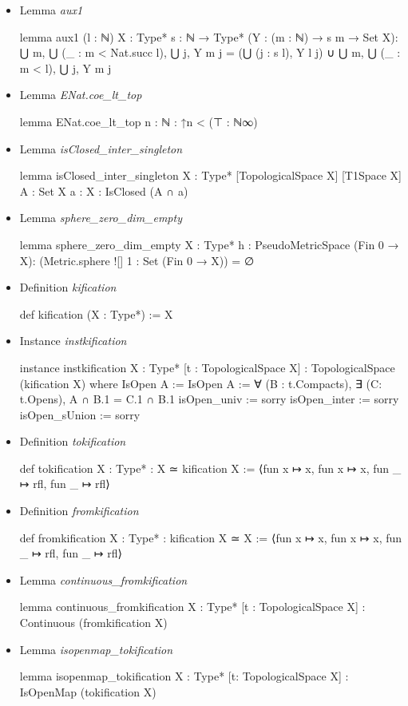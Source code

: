\documentclass[colorinlistoftodos]{article}
\begin{document}
\begin{itemize}
  \item Lemma \emph{aux1}
\begin{leancode}
lemma aux1 (l : ℕ) {X : Type*} {s : ℕ →  Type*} (Y : (m : ℕ) → s m → Set X):
    ⋃ m, ⋃ (_ : m < Nat.succ l), ⋃ j, Y m j = 
    (⋃ (j : s l), Y l j) ∪ ⋃ m, ⋃ (_ : m < l), ⋃ j, Y m j
\end{leancode}
  \item Lemma \emph{ENat.coe\_lt\_top}
\begin{leancode}
lemma ENat.coe_lt_top {n : ℕ} : ↑n < (⊤ : ℕ∞)
\end{leancode}
  \item Lemma \emph{isClosed\_inter\_singleton}
\begin{leancode}
lemma isClosed_inter_singleton {X : Type*} [TopologicalSpace X] [T1Space X] {A : Set X} 
{a : X} : IsClosed (A ∩ {a})
\end{leancode}
  \item Lemma \emph{sphere\_zero\_dim\_empty}
\begin{leancode}
lemma sphere_zero_dim_empty {X : Type*} {h : PseudoMetricSpace (Fin 0 → X)}:
  (Metric.sphere ![] 1 : Set (Fin 0 → X)) = ∅
\end{leancode}
  \item Definition \emph{kification}
\begin{leancode}
def kification (X : Type*) := X
\end{leancode}
  \item Instance \emph{instkification}
\begin{leancode}
instance instkification {X : Type*} [t : TopologicalSpace X] : 
TopologicalSpace (kification X) where
  IsOpen A := IsOpen A := ∀ (B : t.Compacts), ∃ (C: t.Opens), A ∩ B.1 = C.1 ∩ B.1
  isOpen_univ := sorry
  isOpen_inter := sorry
  isOpen_sUnion := sorry
\end{leancode}
  \item Definition \emph{tokification}
\begin{leancode}
def tokification {X : Type*} : X ≃ kification X := 
⟨fun x ↦ x, fun x ↦ x, fun _ ↦ rfl, fun _ ↦ rfl⟩
\end{leancode}
  \item Definition \emph{fromkification}
\begin{leancode}
def fromkification {X : Type*} : kification X ≃ X := 
⟨fun x ↦ x, fun x ↦ x, fun _ ↦ rfl, fun _ ↦ rfl⟩
\end{leancode}
  \item Lemma \emph{continuous\_fromkification}
\begin{leancode}
lemma continuous_fromkification {X : Type*} [t : TopologicalSpace X] : Continuous (fromkification X)
\end{leancode}
  \item Lemma \emph{isopenmap\_tokification}
\begin{leancode}
lemma isopenmap_tokification {X : Type*} [t: TopologicalSpace X] : IsOpenMap (tokification X)
\end{leancode}
\end{itemize}
\end{document}
